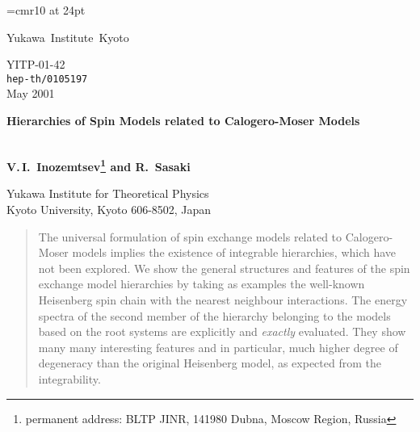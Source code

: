 \documentclass[a4paper,12pt]{article}
\begin{document}
%
\providecommand{\tabtopsp}[1]{\vbox{\vbox to#1{}\vbox to12pt{}}}
\font\larl=cmr10 at 24pt
\providecommand{\es}{\got s}

\providecommand{\preprint}{
            \begin{flushleft}
   \elevenmib Yukawa\, Institute\, Kyoto\\
            \end{flushleft}\vspace{-1.3cm}
            \begin{flushright}\normalsize  \sf
            YITP-01-42\\
           {\tt hep-th/0105197} \\ May 2001
            \end{flushright}}
\providecommand{\Title}[1]{{\baselineskip=26pt \begin{center}
            \Large   \bf #1 \\ \ \\ \end{center}}}
\hspace*{2.13cm}%
\hspace*{0.7cm}%
\providecommand{\Author}{\begin{center}\large \bf
           V.\,I.\, Inozemtsev\footnote{
permanent address: BLTP JINR, 141980 Dubna, Moscow Region, Russia}
 and R.\, Sasaki \end{center}}
\providecommand{\Address}{\begin{center}
            Yukawa Institute for Theoretical Physics\\
     Kyoto University, Kyoto 606-8502, Japan
      \end{center}}
\providecommand{\Accepted}[1]{\begin{center}{\large \sf #1}\\
            \vspace{1mm}{\small \sf Accepted for Publication}
            \end{center}}
\baselineskip=20pt

\preprint
\thispagestyle{empty}
\bigskip
\bigskip
\bigskip


\Title{Hierarchies of Spin Models related to Calogero-Moser Models}
\Author

\Address
\vspace{1cm}

\begin{abstract}
The universal formulation of  spin exchange models related to
Calogero-Moser
models implies the existence of integrable hierarchies, which
have not been explored. We show the general structures and features of the
spin exchange model hierarchies by taking as examples
the well-known Heisenberg
spin chain with the nearest neighbour interactions.
The energy spectra of the second
member  of the hierarchy belonging to the models based on the \coordHE{} root
systems \coordHE{} are  explicitly and {\em exactly\/} evaluated. They
show many many interesting features and in particular,
 much higher degree of degeneracy than the original Heisenberg  model,
 as expected from the integrability.
\end{abstract}
\bigskip
\bigskip
\bigskip
\end{document}
